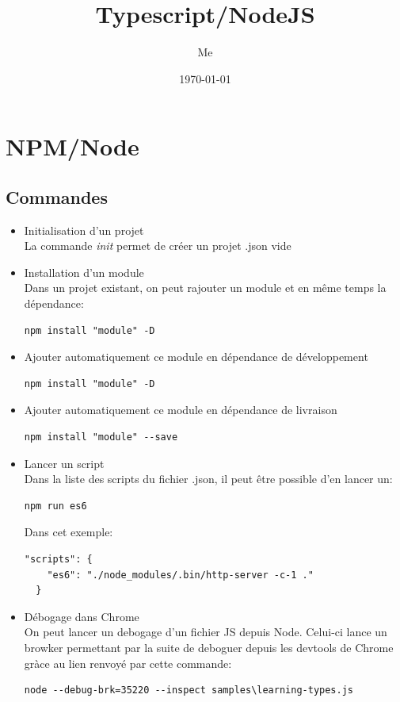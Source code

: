 \documentclass[12pt,oneside]{scrbook}
\title{Typescript/NodeJS}
\author{Me}
\date{\today}
\begin{document}
 
\maketitle 
\tableofcontents


\chapter{NPM/Node}
\section{Commandes}
\begin{itemize}
\item Initialisation d'un projet\\
La commande \textit{init} permet de créer un projet .json vide
\item Installation d'un module\\
Dans un projet existant, on peut rajouter un module et en même temps la dépendance:
\begin{verbatim}
npm install "module" -D
\end{verbatim}
\item Ajouter automatiquement ce module en dépendance de développement
\begin{verbatim}
npm install "module" -D
\end{verbatim}
\item Ajouter automatiquement ce module en dépendance de livraison
\begin{verbatim}
npm install "module" --save
\end{verbatim}
\item Lancer un script\\
Dans la liste des scripts du fichier .json, il peut être possible d'en lancer un:
\begin{verbatim}
npm run es6
\end{verbatim}
Dans cet exemple:
\begin{verbatim}
"scripts": {
    "es6": "./node_modules/.bin/http-server -c-1 ."
  }
\end{verbatim}
\item Débogage dans Chrome\\
On peut lancer un debogage d'un fichier JS depuis Node. Celui-ci lance un browker permettant par la suite de deboguer depuis les devtools de Chrome gràce au lien renvoyé par cette commande:
\begin{verbatim}
node --debug-brk=35220 --inspect samples\learning-types.js
\end{verbatim}
\end{itemize}
\end{document}
